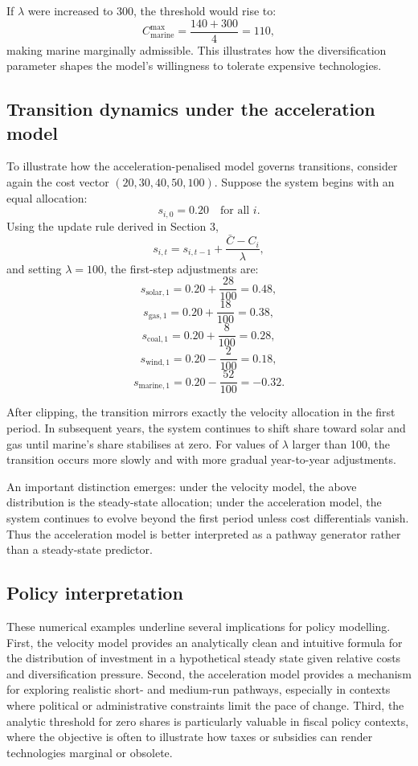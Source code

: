 \documentclass[preprint,authoryear,12pt]{elsarticle}
\begin{document}
If $\lambda$ were increased to 300, the threshold would rise to:
\[
    C_{\text{marine}}^{\max} = \frac{140 + 300}{4} = 110,
\]
making marine marginally admissible. This illustrates how the diversification parameter shapes
the model’s willingness to tolerate expensive technologies.

\subsection{Transition dynamics under the acceleration model}

To illustrate how the acceleration-penalised model governs transitions, consider again the
cost vector $(20, 30, 40, 50, 100)$. Suppose the system begins with an equal allocation:
\[
    s_{i,0} = 0.20 \quad \text{for all } i.
\]
Using the update rule derived in Section 3,
\[
    s_{i,t} = s_{i,t-1} + \frac{\bar{C} - C_i}{\lambda},
\]
and setting $\lambda = 100$, the first-step adjustments are:
\[
    s_{\text{solar},1} = 0.20 + \frac{28}{100} = 0.48,
\]
\[
    s_{\text{gas},1} = 0.20 + \frac{18}{100} = 0.38,
\]
\[
    s_{\text{coal},1} = 0.20 + \frac{8}{100} = 0.28,
\]
\[
    s_{\text{wind},1} = 0.20 - \frac{2}{100} = 0.18,
\]
\[
    s_{\text{marine},1} = 0.20 - \frac{52}{100} = -0.32.
\]

After clipping, the transition mirrors exactly the velocity allocation in the first period. In
subsequent years, the system continues to shift share toward solar and gas until marine's share
stabilises at zero. For values of $\lambda$ larger than 100, the transition occurs more slowly and
with more gradual year-to-year adjustments.

An important distinction emerges: under the velocity model, the above distribution is the
steady-state allocation; under the acceleration model, the system continues to evolve beyond the
first period unless cost differentials vanish. Thus the acceleration model is better interpreted as a
pathway generator rather than a steady-state predictor.

\subsection{Policy interpretation}

These numerical examples underline several implications for policy modelling. First, the velocity
model provides an analytically clean and intuitive formula for the distribution of investment in a
hypothetical steady state given relative costs and diversification pressure. Second, the acceleration
model provides a mechanism for exploring realistic short- and medium-run pathways, especially in
contexts where political or administrative constraints limit the pace of change. Third, the analytic
threshold for zero shares is particularly valuable in fiscal policy contexts, where the objective is
often to illustrate how taxes or subsidies can render technologies marginal or obsolete.
\end{document}
